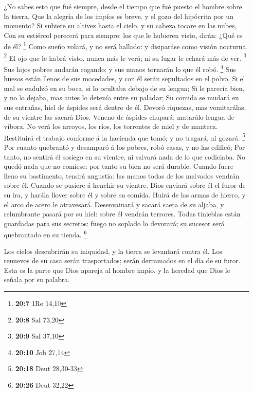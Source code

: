  ¿No sabes esto que fué siempre, desde el tiempo que fué
puesto el hombre sobre la tierra,  Que la alegría de los
impíos es breve, y el gozo del hipócrita por un momento?  Si
subiere su altivez hasta el cielo, y su cabeza tocare en las nubes,
 Con su estiércol perecerá para siempre: los que le hubieren
visto, dirán: ¿Qué es de él? \footnote{\textbf{20:7} 1Re 14,10}
 Como sueño volará, y no será hallado: y disiparáse como
visión nocturna. \footnote{\textbf{20:8} Sal 73,20}  El ojo
que le habrá visto, nunca más le verá; ni su lugar le echará más de ver.
\footnote{\textbf{20:9} Sal 37,10}  Sus hijos pobres
andarán rogando; y sus manos tornarán lo que él robó. \footnote{\textbf{20:10}
  Job 27,14}  Sus huesos están llenos de sus mocedades, y
con él serán sepultados en el polvo.  Si el mal se endulzó
en su boca, si lo ocultaba debajo de su lengua;  Si le
parecía bien, y no lo dejaba, mas antes lo detenía entre su paladar;
 Su comida se mudará en sus entrañas, hiel de áspides será
dentro de él.  Devoró riquezas, mas vomitarálas; de su
vientre las sacará Dios.  Veneno de áspides chupará;
matarálo lengua de víbora.  No verá los arroyos, los ríos,
los torrentes de miel y de manteca.  Restituirá el trabajo
conforme á la hacienda que tomó; y no tragará, ni gozará. \footnote{\textbf{20:18}
  Deut 28,30-33}  Por cuanto quebrantó y desamparó á los
pobres, robó casas, y no las edificó;  Por tanto, no
sentirá él sosiego en su vientre, ni salvará nada de lo que codiciaba.
 No quedó nada que no comiese: por tanto su bien no será
durable.  Cuando fuere lleno su bastimento, tendrá
angustia: las manos todas de los malvados vendrán sobre él.
 Cuando se pusiere á henchir su vientre, Dios enviará sobre
él el furor de su ira, y harála llover sobre él y sobre su comida.
 Huirá de las armas de hierro, y el arco de acero le
atravesará.  Desenvainará y sacará saeta de su aljaba, y
relumbrante pasará por su hiel: sobre él vendrán terrores. 
Todas tinieblas están guardadas para sus secretos: fuego no soplado lo
devorará; su sucesor será quebrantado en su tienda. \footnote{\textbf{20:26}
  Deut 32,22}

 Los cielos descubrirán su iniquidad, y la tierra se
levantará contra él.  Los renuevos de su casa serán
trasportados; serán derramados en el día de su furor.  Esta
es la parte que Dios apareja al hombre impío, y la heredad que Dios le
señala por su palabra.

